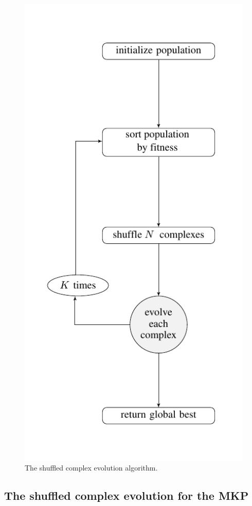 \documentclass[10pt,conference, compsocconf]{IEEEtran}
\begin{document}
\begin{figure}
  \includegraphics{imgs/flow1}
  \caption{The shuffled complex evolution algorithm.}
  \label{fig:flow1}
\end{figure}


\subsection{The shuffled complex evolution for the MKP}
\end{document}
